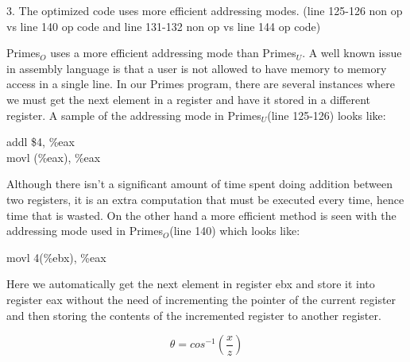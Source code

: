 \documentclass[11pt]{article}
\begin{document}
3. The optimized code uses more efficient addressing modes. (line 125-126 non op vs line 140 op code and line 131-132 non op vs line 144 op code)

Primes$_{O}$ uses a more efficient addressing mode than Primes$_{U}$. A well known issue in assembly language is that a user is not allowed to have memory to memory access in a single line. In our Primes program, there are several instances where we must get the next element in a register and have it stored in a different register. A sample of the addressing mode in Primes$_{U}$(line 125-126) looks like:


\hspace*{2.2in} addl \$4, \%eax \\

\hspace*{2.2in} movl (\%eax), \%eax 


Although there isn't a significant amount of time spent doing addition between two registers, it is an extra computation that must be executed every time, hence time that is wasted. On the other hand a more efficient method is seen with the addressing mode used in Primes$_{O}$(line 140) which looks like: 


\hspace*{2.2in} movl 4(\%ebx), \%eax


Here we automatically get the next element in register ebx and store it into register eax without the need of incrementing the pointer of the current register and then storing the contents of the incremented register to another register.


\begin{equation}
\theta = cos^{-1}(\frac{x}{z})  %
\end{equation}

\end{document}
